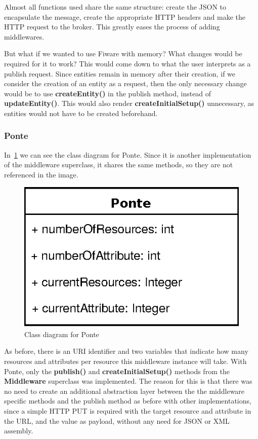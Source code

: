 \documentclass[conference]{IEEEtran}
\begin{document}
Almost all functions used share the same structure: create the JSON to encapsulate the message, create the appropriate HTTP headers and make the HTTP request to the broker. This greatly eases the process of adding middlewares.

But what if we wanted to use Fiware with memory? What changes would be required for it to work? This would come down to what the user interprets as a publish request. Since entities remain in memory after their creation, if we consider the creation of an entity as a request, then the only necessary change would be to use \textbf{createEntity()} in the publish method, instead of \textbf{updateEntity()}. This would also render \textbf{createInitialSetup()} unnecessary, as entities would not have to be created beforehand. 

\subsubsection{Ponte}

In~\ref{fig:class_diagram_ponte} we can see the class diagram for Ponte. Since it is another implementation of the middleware superclass, it shares the same methods, so they are not referenced in the image.

\begin{figure}[htbp!]
  \centering
  \includegraphics[width=0.5\columnwidth]{figures/class_diagram_ponte.eps}
  \caption{Class diagram for Ponte}
  \label{fig:class_diagram_ponte}
\end{figure}

As before, there is an URI identifier and two variables that indicate how many resources and attributes per resource this middleware instance will take. With Ponte, only the \textbf{publish()} and \textbf{createInitialSetup()} methods from the \textbf{Middleware} superclass was implemented. The reason for this is that there was no need to create an additional abstraction layer between the the middleware specific methods and the publish method as before with other implementations, since a simple HTTP PUT is required with the target resource and attribute in the URL, and the value as payload, without any need for JSON or XML assembly.
\end{document}
